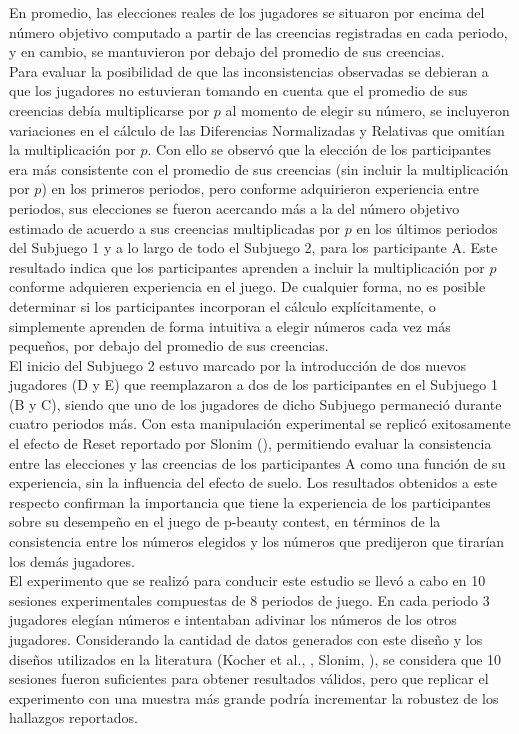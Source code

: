 En promedio, las elecciones reales de los jugadores se situaron por encima del número objetivo computado a partir de las creencias registradas en cada periodo, y en cambio, se mantuvieron por debajo del promedio de sus creencias.\\

Para evaluar la posibilidad de que las inconsistencias observadas se debieran a que los jugadores no estuvieran tomando en cuenta que el promedio de sus creencias debía multiplicarse por $p$ al momento de elegir su número, se incluyeron variaciones en el cálculo de las Diferencias Normalizadas y Relativas que omitían la multiplicación por $p$. Con ello se observó que la elección de los participantes era más consistente con el promedio de sus creencias (sin incluir la multiplicación por $p$) en los primeros periodos, pero conforme adquirieron experiencia entre periodos, sus elecciones se fueron acercando más a la del número objetivo estimado de acuerdo a sus creencias multiplicadas por $p$ en los últimos periodos del Subjuego 1 y a lo largo de todo el Subjuego 2, para los participante A. Este resultado indica que los participantes aprenden a incluir la multiplicación por $p$ conforme adquieren experiencia en el juego. De cualquier forma, no es posible determinar si los participantes incorporan el cálculo explícitamente, o simplemente aprenden de forma intuitiva a elegir números cada vez más pequeños, por debajo del promedio de sus creencias.\\

El inicio del Subjuego 2 estuvo marcado por la introducción de dos nuevos jugadores (D y E) que reemplazaron a dos de los participantes en el Subjuego 1 (B y C), siendo que uno de los jugadores de dicho Subjuego permaneció durante cuatro periodos más. Con esta manipulación experimental se replicó exitosamente el efecto de Reset reportado por Slonim (\citeyear{Slonim}), permitiendo evaluar la consistencia entre las elecciones y las creencias de los participantes A como una función de su experiencia, sin la influencia del efecto de suelo. Los resultados obtenidos a este respecto confirman la importancia que tiene la experiencia de los participantes sobre su desempeño en el juego de p-beauty contest, en términos de la consistencia entre los números elegidos y los números que predijeron que tirarían los demás jugadores. \\

El experimento que se realizó para conducir este estudio se llevó a cabo en 10 sesiones experimentales compuestas de 8 periodos de juego. En cada periodo 3 jugadores elegían números e intentaban adivinar los números de los otros jugadores. Considerando la cantidad de datos generados con este diseño y los diseños utilizados en la literatura (Kocher et al., \citeyear{Kocher}, Slonim, \citeyear{Slonim}), se considera que 10 sesiones fueron suficientes para obtener resultados válidos, pero que replicar el experimento con una muestra más grande podría incrementar la robustez de los hallazgos reportados.\\

